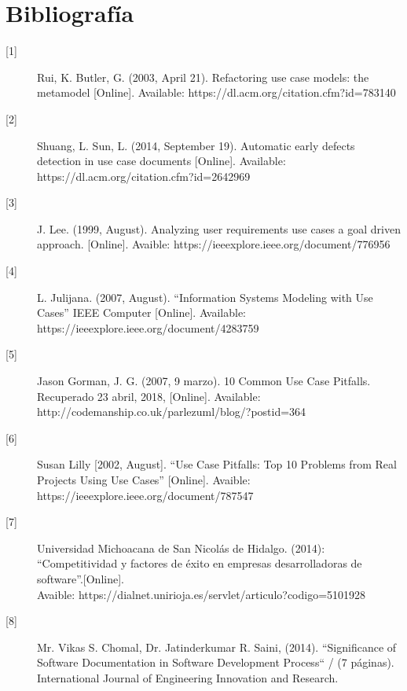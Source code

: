 \chapter{Bibliografía}

\begin{description}
	
		\item[\hypertarget{b01}{[1]}] Rui, K. Butler, G. (2003, April 21). Refactoring use case models: the metamodel [Online]. Available: https://dl.acm.org/citation.cfm?id=783140
		
		\item[\hypertarget{b02}{[2]}] Shuang, L. Sun, L. (2014, September 19). Automatic early defects detection in use case documents [Online]. Available: https://dl.acm.org/citation.cfm?id=2642969
		
		\item[\hypertarget{b03}{[3]}] 
		J. Lee. (1999, August). Analyzing user requirements use cases a goal driven approach. [Online]. Avaible: https://ieeexplore.ieee.org/document/776956
		
		\item[\hypertarget{b04}{[4]}]  L. Julijana. (2007, August). “Information Systems Modeling with Use Cases” IEEE Computer [Online]. Available:
		https://ieeexplore.ieee.org/document/4283759
		
		\item[\hypertarget{b05}{[5]}] Jason Gorman, J. G. (2007, 9 marzo). 10 Common Use Case Pitfalls. Recuperado 23 abril, 2018,  [Online]. Available: http://codemanship.co.uk/parlezuml/blog/?postid=364
		
		\item[\hypertarget{b06}{[6]}] Susan Lilly [2002, August]. “Use Case Pitfalls: Top 10 Problems from Real Projects Using Use Cases” [Online]. Avaible: https://ieeexplore.ieee.org/document/787547
		
		\item[\hypertarget{b07}{[7]}] Universidad Michoacana de San Nicolás de Hidalgo. (2014): “Competitividad y factores de éxito en empresas desarrolladoras de software”.[Online]. \\ Avaible: https://dialnet.unirioja.es/servlet/articulo?codigo=5101928
		
		\item[\hypertarget{b08}{[8]}] Mr. Vikas S. Chomal, Dr. Jatinderkumar R. Saini, (2014). “Significance of Software Documentation in Software
		Development Process“
 / (7 páginas). International Journal of Engineering Innovation and Research. 
		

\end{description}
